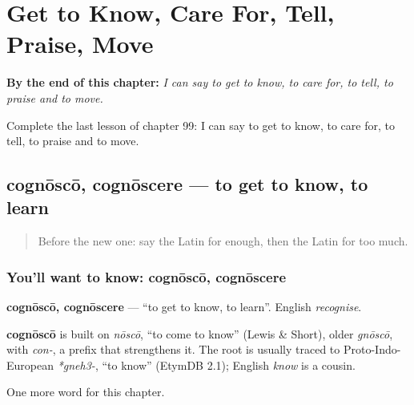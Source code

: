 
\chapter{Get to Know, Care For, Tell, Praise, Move}
\label{ch:la-get-to-know-care-for-tell-praise-move}

\begin{chapteropening}
\textbf{By the end of this chapter:} \emph{I can say to get to know, to care for, to tell, to praise and to move.}

Complete the last lesson of chapter 99: I can say to get to know, to care for, to tell, to praise and to move.
\end{chapteropening}

\section[cognōscō, cognōscere]{cognōscō, cognōscere — to get to know, to learn}

\label{lesson:LA-C99-cognosco}



\begin{quote}
Before the new one: say the Latin for enough, then the Latin for too much.
\end{quote}

\subsection*{You'll want to know: cognōscō, cognōscere}
\textbf{cognōscō, cognōscere} — \textquotedblleft{}to get to know, to learn\textquotedblright{}. English \emph{recognise}.

\begin{cousinweb}
\textbf{cognōscō} is built on \emph{nōscō}, \textquotedblleft{}to come to know\textquotedblright{} (Lewis \& Short), older \emph{gnōscō}, with \emph{con-}, a prefix that strengthens it. The root is usually traced to Proto-Indo-European \emph{*gneh3-}, \textquotedblleft{}to know\textquotedblright{} (EtymDB 2.1); English \emph{know} is a cousin.
\end{cousinweb}

\begin{grammarlens}[title={What you've built}]
One more word for this chapter.
\end{grammarlens}

